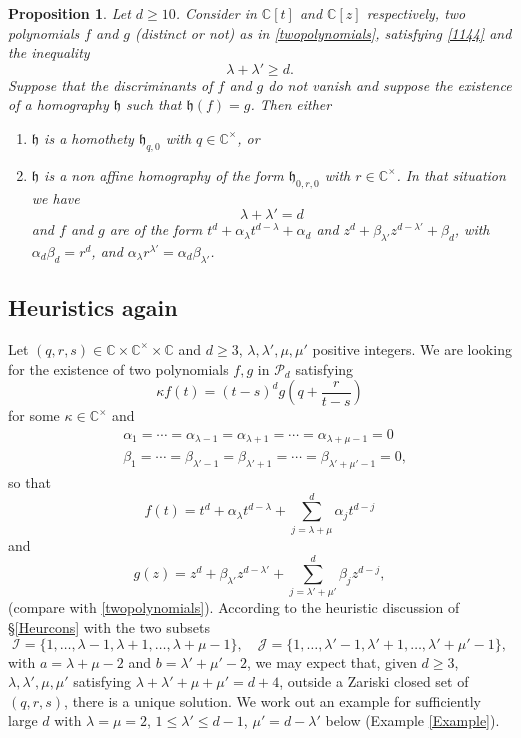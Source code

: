 \documentclass[10pt]{article}
\newtheorem{proposition}[theorem]{Proposition}
\theoremstyle{definition}
\numberwithin{equation}{section}
\newcommand {\C}{{\mathbb{C}}}
\begin{document}
\begin{proposition} \label{central} Let $d\geqslant 10$. Consider in $\C [t]$ and $\C [z]$ respectively, two polynomials $f$ and $g$ (distinct or not)
as in \eqref{twopolynomials}, satisfying \eqref{1144} and the inequality
\begin{equation}\label{1151}
\lambda + \lambda ' \geqslant d.\end{equation}
Suppose that the discriminants of $f$ and $g$ do not vanish and suppose 
 the existence of a
 homography $\mathfrak h$ such that $\mathfrak h (f) = g$.
 Then either 
\begin{enumerate}
\item $\mathfrak h$ is a homothety $\mathfrak h_{q,0}$ with $q\in \C^\times$,
or
\item $\mathfrak h$ is a non affine homography of the form $\mathfrak h_{0, r, 0}$ with $r\in \C^\times$. In that situation we have 
\begin{equation}\label{1159}
\lambda +\lambda' =d
\end{equation}and $f$ and $g$
are of the form $t^d +\alpha_{\lambda} t^{d-\lambda} + \alpha_d $ and $z^d+ \beta_{\lambda'} z^{d-\lambda'}+ \beta_d$, with $\alpha_d \beta_d =r^d$, 
 and $ \alpha_\lambda r^{\lambda'}= \alpha_d \beta_{\lambda'}$.
\end{enumerate}
\end{proposition}
 
\subsection{Heuristics again}

 Let $(q,r,s)\in\C\times \C^\times \times \C$ and $d\geqslant 3$, $\lambda,\lambda',\mu,\mu'$ positive integers. We are looking for the existence of two polynomials $f,g$ in $\mathcal P_d$ satisfying 
\[
\kappa f(t)=(t-s)^d g \left( q+\frac r {t-s}\right)
\]
for some $\kappa\in\C^\times$ 
and 
 \[
 \begin{aligned}
 &\alpha_1=\cdots=\alpha_{\lambda-1}=\alpha_{\lambda+1}=\cdots=\alpha_{\lambda+\mu-1}=0
 \\ 
 &\beta_1=\cdots=\beta_{\lambda'-1}=\beta_{\lambda'+1}=\cdots=\beta_{\lambda'+\mu'-1}=0,
 \end{aligned}
 \]
 so that
 \[
 f(t)= t^d+\alpha_{\lambda}t^{d-\lambda}+
\sum_{j=\lambda+\mu}^d \alpha_jt^{d-j}
\]
and
\[
g(z)= z^d+ \beta_{\lambda'}z^{d-\lambda'}+
\sum_{j=\lambda'+\mu'}^d \beta_jz^{d-j},
\] 
(compare with \eqref{twopolynomials}). According to the heuristic discussion of \S \ref{Heurcons}
with the two subsets 
\[
\mathcal I=\{1,\dots,\lambda-1,\lambda+1,\dots,\lambda+\mu-1\}, \quad \mathcal J=\{1,\dots,\lambda'-1,\lambda'+1,\dots,\lambda'+\mu'-1\}, 
\]
with $a=\lambda+\mu-2$ and $b=\lambda'+\mu'-2$, we may expect that, given $d\geqslant 3$, $\lambda,\lambda',\mu,\mu'$ satisfying 
 $\lambda +\lambda'+\mu+\mu'=d+4$, outside a Zariski closed set of $(q,r,s)$, there is a unique solution. We work out an example for sufficiently large $d$ with $\lambda=\mu=2$, $1\leqslant \lambda'\leqslant d-1$, $\mu'=d-\lambda'$ below (Example \ref{Example}). 
 
\end{document}
